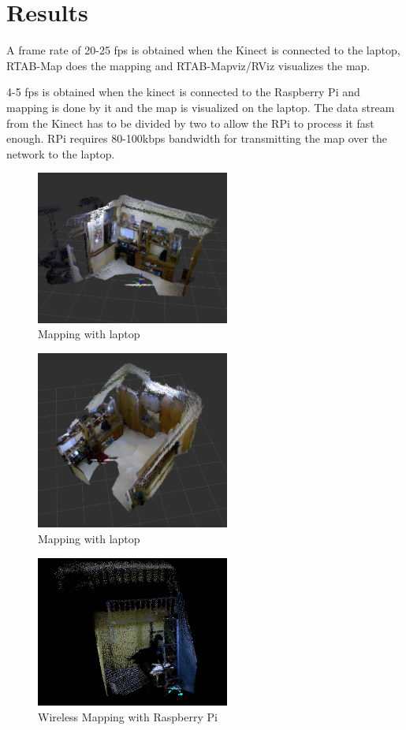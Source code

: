 \documentclass[journal]{IEEEtran}
\begin{document}
\section{Results}
A frame rate of 20-25 fps is obtained when the Kinect is connected to the laptop, RTAB-Map does the mapping and RTAB-Mapviz/RViz visualizes the map. 

4-5 fps is obtained when the kinect is connected to the Raspberry Pi and mapping is done by it and the map is visualized on the laptop. The data stream from the Kinect has to be divided by two to allow the RPi to process it fast enough. RPi requires 80-100kbps bandwidth for transmitting the map over the network to the laptop.



\begin{figure}[ht]
\centering
\includegraphics[width=2.5in]{1(1).png}
\caption{Mapping with laptop}
\label{fig_sim}
\end{figure}
 
\begin{figure}[ht]
	\centering
	\includegraphics[width=2.5in]{1(2).png}
	\caption{Mapping with laptop}
	\label{fig_sim}
\end{figure}

\begin{figure}[ht]
	\centering
	\includegraphics[width=2.5in]{2(1).png}
	\caption{Wireless Mapping with Raspberry Pi}
	\label{fig_sim}
\end{figure}
\end{document}
